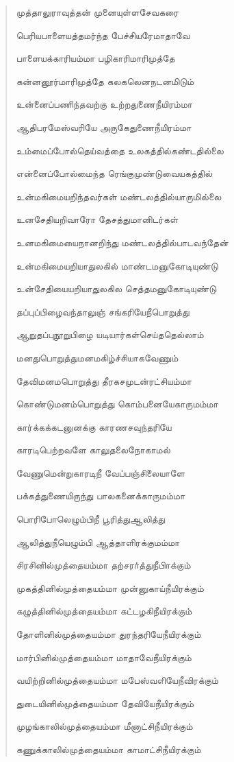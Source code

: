 \documentclass{article}
\begin{document}
\begin{quotation}
{முத்தாலுராவுத்தன் முனையுள்ளசேவகரை

பெரியபாளையத்தமர்ந்த பேச்சியரேமாதாவே

பாளையக்காரியம்மா பழிகாரிமாரிமுத்தே

கன்னனூர்மாரிமுத்தே கலகலெனநடனமிடும்

உன்னைப்பணிந்தவற்கு உற்றதுணைநீயிரம்மா

ஆதிபரமேஸ்வரியே அருகேதுணைநீயிரம்மா

உம்மைப்போல்தெய்வத்தை உலகத்தில்கண்டதில்லை

என்னைப்போல்மைந்த ரெங்குமுண்டுவையகத்தில்

உன்மகிமையறிந்தவர்கள் மண்டலத்தில்யாருமில்லை

உனசேதியறிவாரோ தேசத்துமானிடர்கள்

உனமகிமையைநானறிந்து மண்டலத்தில்பாடவந்தேன்

உன்மகிமையறியாதுலகில் மாண்டமனுகோடியுண்டு

உன்சேதியையறியாதுலகில செத்தமனுகோடியுண்டு

தப்புப்பிழைவந்தாலுஞ் சங்கரியேநீபொறுத்து

ஆறுதப்புநூறுபிழை யடியார்கள்செய்ததெல்லாம்

மனதுபொறுத்துமனமகிழ்ச்சியாகவேணும்

தேவிமனமபொறுத்து தீரகசமுடன்ரட்சியம்மா

கொண்டுமனம்பொறுத்து கொம்பனையேகாருமம்மா

கார்க்கக்கடனுனக்கு காரணசவுந்தரியே

காரடிபெற்றவளே காலுதலைநோகாமல்

வேணுமென்றுகாரடிநீ வேப்பஞ்சிலையாளே

பக்கத்துணையிருந்து பாலகனைக்காருமம்மா

பொரிபோலெழும்பிநீ பூரித்துஆலித்து

ஆலித்துநீயெழும்பி ஆத்தாளிரக்குமம்மா

சிரசினில்முத்தையம்மா தற்சரா்த்துநீபிாக்கும்

முகத்‌தினில்முத்தையம்மா முன்னுகாய்நீயிரக்கும்‌

கழுத்தினில்முத்தையம்மா கட்டழகிநீயிரக்கும்

தோளினில்முத்தையம்மா துரந்தரியேநீயிரக்கும்

மார்பினில்முத்தையம்மா மாதாவேநீயிரக்கும்

வயிற்றினில்முத்தையம்மா மபேஸ்வஎியேநீவிரக்கும்

துடையினில்முத்தையம்மா தேவியேநீயிரக்கும்

முழங்காலில்முத்தையம்மா மீனாட்சிநீயிரக்கும்

கணுக்காலில்முத்தையம்மா காமாட்சிநீயிரக்கும்

}
\end{quotation}
\end{document}
